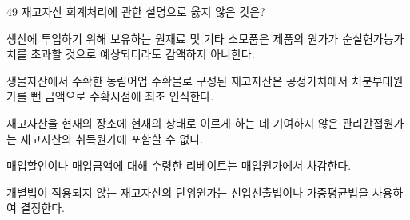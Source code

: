 \begin{question}{49}
재고자산 회계처리에 관한 설명으로 옳지 않은 것은?
\begin{choices}
  \item 생산에 투입하기 위해 보유하는 원재료 및 기타 소모품은 제품의 원가가 순실현가능가치를 초과할 것으로 예상되더라도 감액하지 아니한다.
  \item 생물자산에서 수확한 농림어업 수확물로 구성된 재고자산은 공정가치에서 처분부대원가를 뺀 금액으로 수확시점에 최초 인식한다.
  \item 재고자산을 현재의 장소에 현재의 상태로 이르게 하는 데 기여하지 않은 관리간접원가는 재고자산의 취득원가에 포함할 수 없다.
  \item 매입할인이나 매입금액에 대해 수령한 리베이트는 매입원가에서 차감한다.
  \item 개별법이 적용되지 않는 재고자산의 단위원가는 선입선출법이나 가중평균법을 사용하여 결정한다.
\end{choices}
\end{question}
